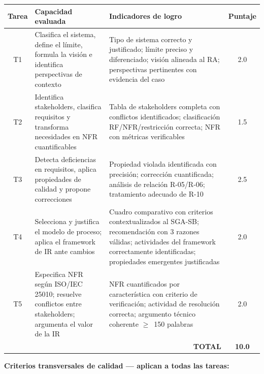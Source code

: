 \documentclass[11pt,a4paper]{article}
\newcommand{\thdr}[1]{\cellcolor{darkgreen}\color{white}\bfseries #1}
\begin{document}
	\vspace{6pt}
	\noindent
	{\small
		\begin{tabular}{|c|p{3.8cm}|p{5.5cm}|c|}
			\hline
			\thdr{Tarea} &
			\thdr{Capacidad evaluada} &
			\thdr{Indicadores de logro} &
			\thdr{Puntaje} \\
			\hline
			T1 & Clasifica el sistema, define el límite, formula la visión e identifica
			perspectivas de contexto &
			Tipo de sistema correcto y justificado; límite preciso y diferenciado;
			visión alineada al RA; perspectivas pertinentes con evidencia del caso &
			2.0 \\
			\hline
			T2 & Identifica stakeholders, clasifica requisitos y transforma
			necesidades en NFR cuantificables &
			Tabla de stakeholders completa con conflictos identificados;
			clasificación RF/NFR/restricción correcta; NFR con métricas verificables &
			1.5 \\
			\hline
			T3 & Detecta deficiencias en requisitos, aplica propiedades de calidad y
			propone correcciones &
			Propiedad violada identificada con precisión; corrección cuantificada;
			análisis de relación R-05/R-06; tratamiento adecuado de R-10 &
			2.5 \\
			\hline
			T4 & Selecciona y justifica el modelo de proceso; aplica el framework de
			IR ante cambios &
			Cuadro comparativo con criterios contextualizados al SGA-SB;
			recomendación con 3 razones válidas; actividades del framework
			correctamente identificadas; propiedades emergentes justificadas &
			2.0 \\
			\hline
			T5 & Especifica NFR según ISO/IEC 25010; resuelve conflictos entre
			stakeholders; argumenta el valor de la IR &
			NFR cuantificados por característica con criterio de verificación;
			actividad de resolución correcta; argumento técnico coherente
			$\geq$~150 palabras &
			2.0 \\
			\hline
			\multicolumn{3}{|r|}{\cellcolor{darkgreen}\color{white}\bfseries TOTAL} &
			\cellcolor{darkgreen}\color{white}\bfseries 10.0 \\
			\hline
	\end{tabular}}
	
	\vspace{10pt}
	\textbf{Criterios transversales de calidad --- aplican a todas las tareas:}
	
\end{document}
